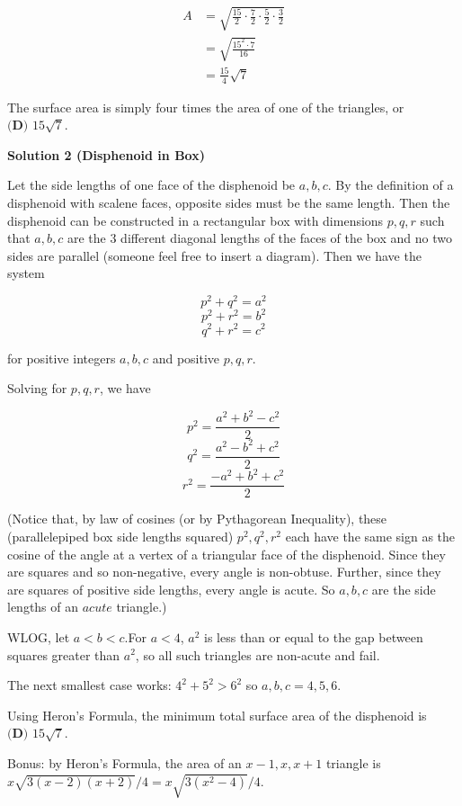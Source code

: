 \begin{enumerate}
 \begin{align*}A&=\sqrt{\frac{15}{2}\cdot\frac{7}{2}\cdot\frac{5}{2}\cdot\frac{3}{2}}\\&=\sqrt{\frac{15^2\cdot7}{16}}\\&=\frac{15}{4}\sqrt{7}\end{align*}


 The surface area is simply four times the area of one of the triangles, or $\boxed{\textbf{(D) }15\sqrt{7}}$.

 



\textbf{Solution 2 (Disphenoid in Box)}

Let the side lengths of one face of the disphenoid be $a, b, c$. By the definition of a disphenoid with scalene faces, opposite sides must be the same length. Then the disphenoid can be constructed in a rectangular box with dimensions $p, q, r$ such that $a, b, c$ are the $3$ different diagonal lengths of the faces of the box and no two sides are parallel (someone feel free to insert a diagram). Then we have the system

 
 \[p^2 + q^2 = a^2\]
 \[p^2 + r^2 = b^2\]
 \[q^2 + r^2 = c^2\]

 for positive integers $a, b, c$ and positive $p, q, r$.

 Solving for $p, q, r$, we have

 
 \[p^2 = \frac{a^2 + b^2 - c^2}{2}\]
 \[q^2 = \frac{a^2 - b^2 + c^2}{2}\]
 \[r^2 = \frac{-a^2 + b^2 + c^2}{2}\]

 
(Notice that, by law of cosines (or by Pythagorean Inequality), these (parallelepiped box side lengths squared) $p^2, q^2, r^2$ each have the same sign as the cosine of the angle at a vertex of a triangular face of the disphenoid. Since they are squares and so non-negative, every angle is non-obtuse. Further, since they are squares of positive side lengths, every angle is acute. So $a, b, c$ are the side lengths of an $\textit{acute}$ triangle.)

 WLOG, let $a < b < c$.For $a<4$, $a^2$ is less than or equal to the gap between squares greater than $a^2$, so all such triangles are non-acute and fail. 

 The next smallest case works:  $4^2 + 5^2 > 6^2$ so $a, b, c = 4, 5, 6$. 

 Using Heron's Formula, the minimum total surface area of the disphenoid is $\boxed{\textbf{(D) }15\sqrt{7}}$.

 Bonus: by Heron’s Formula, the area of an $x-1, x, x+1$ triangle is $x \sqrt{3 (x-2)(x+2)}/4 = x \sqrt{3 (x^2-4)}/4$.


\end{enumerate}
